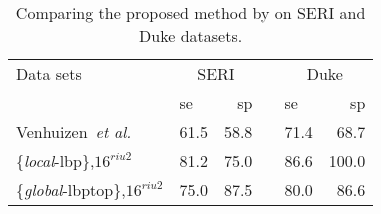 
\begin{table}[H]
\caption{Comparing the proposed method by \cite{Venhuizen2015} on SERI and Duke datasets.}%
\centering
\scriptsize{
\begin{tabular}{l	lr c lr}
\toprule
Data sets 	& \multicolumn{2}{c}{SERI} & & \multicolumn{2}{c}{Duke} \\
  \cmidrule(l){2-3}  \cmidrule(l){5-6}
	         & \ac{se} & \ac{sp} & & \ac{se} & \ac{sp}\\
\midrule
Venhuizen~\textit{et al.} \cite{Venhuizen2015} 		& 61.5 & 58.8 & & 71.4 & 68.7\\
\{\emph{local}-\ac{lbp}\},$16^{riu2}$ 	& 81.2 & 75.0 & & 86.6 & 100.0   \\
\{\emph{global}-\ac{lbptop}\},$16^{riu2}$				& 75.0 & 87.5 & & 80.0 & 86.6  \\


\bottomrule
\end{tabular}}
\label{tab:table1-2}
\end{table}
